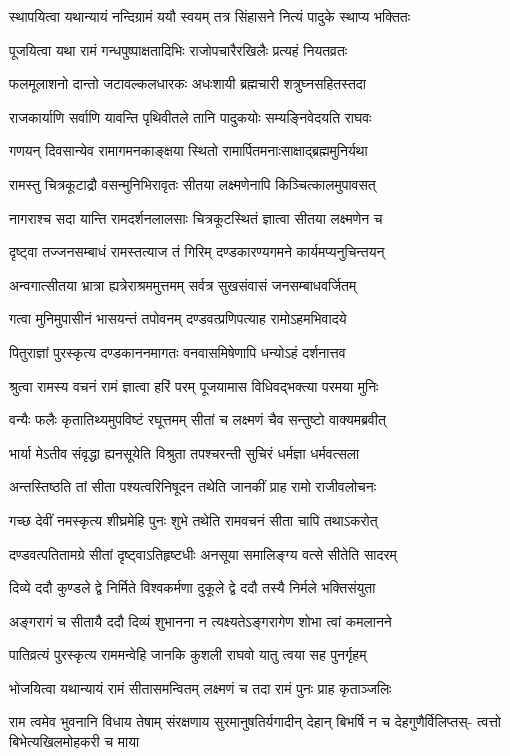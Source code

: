\twolineshloka
{स्थापयित्वा यथान्यायं नन्दिग्रामं ययौ स्वयम्}
{तत्र सिंहासने नित्यं पादुके स्थाप्य भक्तितः} %

\twolineshloka
{पूजयित्वा यथा रामं गन्धपुष्पाक्षतादिभिः}
{राजोपचारैरखिलैः प्रत्यहं नियतव्रतः} %

\twolineshloka
{फलमूलाशनो दान्तो जटावल्कलधारकः}
{अधःशायी ब्रह्मचारी शत्रुघ्नसहितस्तदा} %

\twolineshloka
{राजकार्याणि सर्वाणि यावन्ति पृथिवीतले}
{तानि पादुकयोः सम्यङ्निवेदयति राघवः} %

\twolineshloka
{गणयन् दिवसान्येव रामागमनकाङ्क्षया}
{स्थितो रामार्पितमनाःसाक्षाद्ब्रह्ममुनिर्यथा} %

\twolineshloka
{रामस्तु चित्रकूटाद्रौ वसन्मुनिभिरावृतः}
{सीतया लक्ष्मणेनापि किञ्चित्कालमुपावसत्} %

\twolineshloka
{नागराश्च सदा यान्ति रामदर्शनलालसाः}
{चित्रकूटस्थितं ज्ञात्वा सीतया लक्ष्मणेन च} %

\twolineshloka
{दृष्ट्वा तज्जनसम्बाधं रामस्तत्याज तं गिरिम्}
{दण्डकारण्यगमने कार्यमप्यनुचिन्तयन्} %

\twolineshloka
{अन्वगात्सीतया भ्रात्रा ह्यत्रेराश्रममुत्तमम्}
{सर्वत्र सुखसंवासं जनसम्बाधवर्जितम्} %

\twolineshloka
{गत्वा मुनिमुपासीनं भासयन्तं तपोवनम्}
{दण्डवत्प्रणिपत्याह रामोऽहमभिवादये} %

\twolineshloka
{पितुराज्ञां पुरस्कृत्य दण्डकाननमागतः}
{वनवासमिषेणापि धन्योऽहं दर्शनात्तव} %

\twolineshloka
{श्रुत्वा रामस्य वचनं रामं ज्ञात्वा हरिं परम्}
{पूजयामास विधिवद्भक्त्या परमया मुनिः} %

\twolineshloka
{वन्यैः फलैः कृतातिथ्यमुपविष्टं रघूत्तमम्}
{सीतां च लक्ष्मणं चैव सन्तुष्टो वाक्यमब्रवीत्} %

\twolineshloka
{भार्या मेऽतीव संवृद्धा ह्यनसूयेति विश्रुता}
{तपश्चरन्ती सुचिरं धर्मज्ञा धर्मवत्सला} %

\twolineshloka
{अन्तस्तिष्ठति तां सीता पश्यत्वरिनिषूदन}
{तथेति जानकीं प्राह रामो राजीवलोचनः} %

\twolineshloka
{गच्छ देवीं नमस्कृत्य शीघ्रमेहि पुनः शुभे}
{तथेति रामवचनं सीता चापि तथाऽकरोत्} %

\twolineshloka
{दण्डवत्पतितामग्रे सीतां दृष्ट्वाऽतिहृष्टधीः}
{अनसूया समालिङ्ग्य वत्से सीतेति सादरम्} %

\twolineshloka
{दिव्ये ददौ कुण्डले द्वे निर्मिते विश्वकर्मणा}
{दुकूले द्वे ददौ तस्यै निर्मले भक्तिसंयुता} %

\twolineshloka
{अङ्गरागं च सीतायै ददौ दिव्यं शुभानना}
{न त्यक्ष्यतेऽङ्गरागेण शोभा त्वां कमलानने} %

\twolineshloka
{पातिव्रत्यं पुरस्कृत्य राममन्वेहि जानकि}
{कुशली राघवो यातु त्वया सह पुनर्गृहम्} %

\twolineshloka
{भोजयित्वा यथान्यायं रामं सीतासमन्वितम्}
{लक्ष्मणं च तदा रामं पुनः प्राह कृताञ्जलिः} %

\fourlineindentedshloka
{राम त्वमेव भुवनानि विधाय तेषाम्}
{संरक्षणाय सुरमानुषतिर्यगादीन्}
{देहान् बिभर्षि न च देहगुणैर्विलिप्तस्-}
{त्वत्तो बिभेत्यखिलमोहकरी च माया} %


